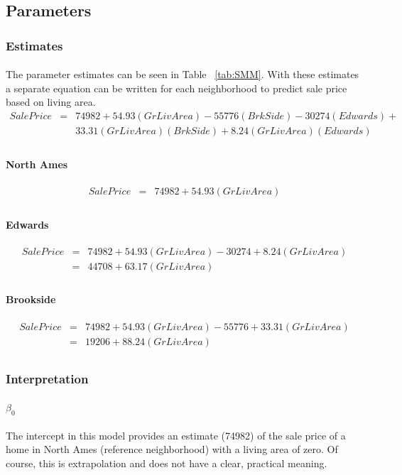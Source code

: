\documentclass[11pt]{scrartcl} %
\begin{document}
\subsection{Parameters}
\subsubsection{Estimates}
\paragraph{} The parameter estimates can be seen in Table ~\ref{tab:SMM}. With these estimates a separate equation can be written for each neighborhood to predict sale price based on living area.
\begin{eqnarray*}
SalePrice &=& 74982 + 54.93(GrLivArea) - 55776(BrkSide) - 30274(Edwards) + \\
& & 33.31(GrLivArea)(BrkSide) + 8.24(GrLivArea)(Edwards)\\
\end{eqnarray*}
\paragraph{North Ames}
\begin{eqnarray*}
SalePrice &=& 74982 + 54.93(GrLivArea)\\
\end{eqnarray*}
\paragraph{Edwards}
\begin{eqnarray*}
SalePrice &=& 74982 + 54.93(GrLivArea) - 30274 + 8.24(GrLivArea)\\
&=& 44708 + 63.17(GrLivArea)\\
\end{eqnarray*}
\paragraph{Brookside}
\begin{eqnarray*}
SalePrice &=& 74982 + 54.93(GrLivArea) - 55776 + 33.31(GrLivArea)\\
&=& 19206 + 88.24(GrLivArea)\\
\end{eqnarray*}
\subsubsection{Interpretation}
\paragraph{$\beta_0$}The intercept in this model provides an estimate (74982) of the sale price of a home in North Ames (reference neighborhood) with a living area of zero. Of course, this is extrapolation and does not have a clear, practical meaning.
\end{document}

